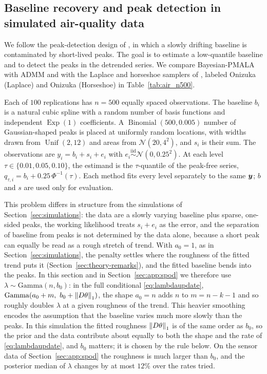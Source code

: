 \subsection{Baseline recovery and peak detection in simulated air-quality data}
\label{sec:air_simulation}

We follow the peak-detection design of \citet[Section~4.2]{brantley2020baseline}, in which a slowly drifting baseline is contaminated by short-lived peaks. The goal is to estimate a low-quantile baseline and to detect the peaks in the detrended series. We compare Bayesian-PMALA with ADMM \citep{brantley2020baseline} and with the Laplace and horseshoe samplers of \citet{onizuka2024fast}, labeled Onizuka (Laplace) and Onizuka (Horseshoe) in Table~\ref{tab:air_n500}.

Each of $100$ replications has $n=500$ equally spaced observations. The baseline $b_i$ is a natural cubic spline with a random number of basis functions and independent $\operatorname{Exp}(1)$ coefficients. A $\operatorname{Binomial}(500,0.005)$ number of Gaussian-shaped peaks is placed at uniformly random locations, with widths drawn from $\operatorname{Unif}(2,12)$ and areas from $\mathcal{N}(20,4^2)$, and $s_i$ is their sum. The observations are $y_i=b_i+s_i+e_i$ with $e_i\stackrel{\mathrm{iid}}{\sim}\mathcal{N}(0,0.25^2)$. At each level $\tau\in\{0.01,0.05,0.10\}$, the estimand is the $\tau$-quantile of the peak-free series, $q_{\tau,i}=b_i+0.25\,\Phi^{-1}(\tau)$. Each method fits every level separately to the same $\bm{y}$; $b$ and $s$ are used only for evaluation.

This problem differs in structure from the simulations of Section~\ref{sec:simulations}: the data are a slowly varying baseline plus sparse, one-sided peaks, the working likelihood treats $s_i+e_i$ as the error, and the separation of baseline from peaks is not determined by the data alone, because a short peak can equally be read as a rough stretch of trend. With $a_0=1$, as in Section~\ref{sec:simulations}, the penalty settles where the roughness of the fitted trend puts it (Section~\ref{sec:theory-remarks}), and the fitted baseline bends into the peaks. In this section and in Section~\ref{sec:app:spod} we therefore use $\lambda\sim\mathrm{Gamma}(n,b_0)$: in the full conditional \eqref{eq:lambdaupdate}, $\mathrm{Gamma}(a_0+m,\ b_0+\norm{D\theta}_1)$, the shape $a_0=n$ adds $n$ to $m=n-k-1$ and so roughly doubles $\lambda$ at a given roughness of the trend. This heavier smoothing encodes the assumption that the baseline varies much more slowly than the peaks. In this simulation the fitted roughness $\left\lVert D\theta\right\rVert_1$ is of the same order as $b_0$, so the prior and the data contribute about equally to both the shape and the rate of \eqref{eq:lambdaupdate}, and $b_0$ matters; it is chosen by the rule below. On the sensor data of Section~\ref{sec:app:spod} the roughness is much larger than $b_0$, and the posterior median of $\lambda$ changes by at most $12\%$ over the rates tried.

